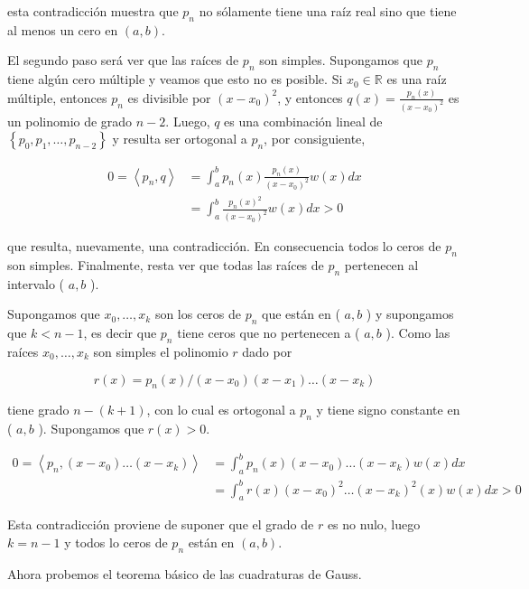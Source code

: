 \documentclass[10pt]{book}
\begin{document}
esta contradicción muestra que $p_{n}$ no sólamente tiene una raíz real sino que tiene al menos un cero en $(a, b)$.

El segundo paso será ver que las raíces de $p_{n}$ son simples. Supongamos que $p_{n}$ tiene algún cero múltiple y veamos que esto no es posible. Si $x_{0} \in \mathbb{R}$ es una raíz múltiple, entonces $p_{n}$ es divisible por $\left(x-x_{0}\right)^{2}$, y entonces $q(x)=\frac{p_{n}(x)}{\left(x-x_{0}\right)^{2}}$ es un polinomio de grado $n-2$. Luego, $q$ es una combinación lineal de $\left\{p_{0}, p_{1}, \ldots, p_{n-2}\right\}$ y resulta ser ortogonal a $p_{n}$, por consiguiente,

$$
\begin{aligned}
0=\left\langle p_{n}, q\right\rangle & =\int_{a}^{b} p_{n}(x) \frac{p_{n}(x)}{\left(x-x_{0}\right)^{2}} w(x) d x \\
& =\int_{a}^{b} \frac{p_{n}(x)^{2}}{\left(x-x_{0}\right)^{2}} w(x) d x>0
\end{aligned}
$$

que resulta, nuevamente, una contradicción. En consecuencia todos lo ceros de $p_{n}$ son simples. Finalmente, resta ver que todas las raíces de $p_{n}$ pertenecen al intervalo ( $a, b$ ).

Supongamos que $x_{0}, \ldots, x_{k}$ son los ceros de $p_{n}$ que están en ( $a, b$ ) y supongamos que $k<n-1$, es decir que $p_{n}$ tiene ceros que no pertenecen a ( $a, b$ ). Como las raíces $x_{0}, \ldots, x_{k}$ son simples el polinomio $r$ dado por

$$
r(x)=p_{n}(x) /\left(x-x_{0}\right)\left(x-x_{1}\right) \ldots\left(x-x_{k}\right)
$$

tiene grado $n-(k+1)$, con lo cual es ortogonal a $p_{n}$ y tiene signo constante en ( $a, b$ ). Supongamos que $r(x)>0$.

$$
\begin{aligned}
0=\left\langle p_{n},\left(x-x_{0}\right) \ldots\left(x-x_{k}\right)\right\rangle & =\int_{a}^{b} p_{n}(x)\left(x-x_{0}\right) \ldots\left(x-x_{k}\right) w(x) d x \\
& =\int_{a}^{b} r(x)\left(x-x_{0}\right)^{2} \ldots\left(x-x_{k}\right)^{2}(x) w(x) d x>0
\end{aligned}
$$

Esta contradicción proviene de suponer que el grado de $r$ es no nulo, luego $k=n-1$ y todos lo ceros de $p_{n}$ están en $(a, b)$.

Ahora probemos el teorema básico de las cuadraturas de Gauss.
\end{document}
